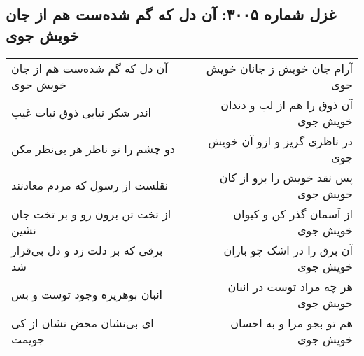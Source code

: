 \begin{center}
\section*{غزل شماره ۳۰۰۵: آن دل که گم شده‌ست هم از جان خویش جوی}
\label{sec:3005}
\begin{longtable}{l p{0.5cm} r}
آن دل که گم شده‌ست هم از جان خویش جوی
&&
آرام جان خویش ز جانان خویش جوی
\\
اندر شکر نیابی ذوق نبات غیب
&&
آن ذوق را هم از لب و دندان خویش جوی
\\
دو چشم را تو ناظر هر بی‌نظر مکن
&&
در ناظری گریز و ازو آن خویش جوی
\\
نقلست از رسول که مردم معادنند
&&
پس نقد خویش را برو از کان خویش جوی
\\
از تخت تن برون رو و بر تخت جان نشین
&&
از آسمان گذر کن و کیوان خویش جوی
\\
برقی که بر دلت زد و دل بی‌قرار شد
&&
آن برق را در اشک چو باران خویش جوی
\\
انبان بوهریره وجود توست و بس
&&
هر چه مراد توست در انبان خویش جوی
\\
ای بی‌نشان محض نشان از کی جویمت
&&
هم تو بجو مرا و به احسان خویش جوی
\\
\end{longtable}
\end{center}
